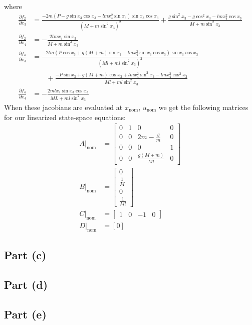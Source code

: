 \documentclass[11pt]{article}
\begin{document}
where
\begin{align*}
	\frac{\partial f_2}{\partial x_3} &= \frac{-2m(P-g\sin x_3\cos x_3-lmx_4^2\sin x_3)\sin x_3 \cos x_3}{(M+m\sin^2x_3)^2} + \frac{g\sin^2x_3 - g\cos^2x_3 - lmx_4^2\cos x_3}{M+m\sin^2x_3} \\
	\frac{\partial f_2}{\partial x_4} &= -\frac{2lmx_4\sin x_3}{M+m\sin^2x_3} \\
	\frac{\partial f_4}{\partial x_3} &= \frac{-2lm(P\cos x_3 + g(M+m)\sin x_3 - lmx_4^2\sin x_3 \cos x_3)\sin x_3 \cos x_3}{(Ml + ml\sin^2x_3)^2} \\ &\qquad + \frac{-P\sin x_3 + g(M+m)\cos x_3 + lmx_4^2\sin^2x_3 - lmx_4^2\cos^2x_3}{Ml + ml\sin^2x_3} \\
	\frac{\partial f_4}{\partial x_4} &= -\frac{2mlx_4\sin x_3 \cos x_3}{ML + ml\sin^2x_3}
\end{align*}
When these jacobians are evaluated at $x_\text{nom}$, $u_\text{nom}$ we get the following matrices for our linearized state-space equations:
\begin{align*}
	A|_\text{nom} &= \begin{bmatrix} 
					0 & 1 & 0 & 0 \\ 
					0 & 0 & 2m-\frac{g}{m} & 0 \\
					0 & 0 & 0 & 1 \\ 
					0 & 0 & \frac{g(M+m)}{Ml} & 0 \end{bmatrix} \\
	B|_\text{nom} &= \begin{bmatrix} 
					0 \\ \frac{1}{M} \\ 0 \\ \frac{1}{Ml} 
					\end{bmatrix} \\
	C|_\text{nom} &= \begin{bmatrix}
					1 & 0 & -1 & 0 \end{bmatrix} \\
	D|_\text{nom} &= [0]
\end{align*}

\subsection*{Part (c)}
\subsection*{Part (d)}
\subsection*{Part (e)}
\end{document}
